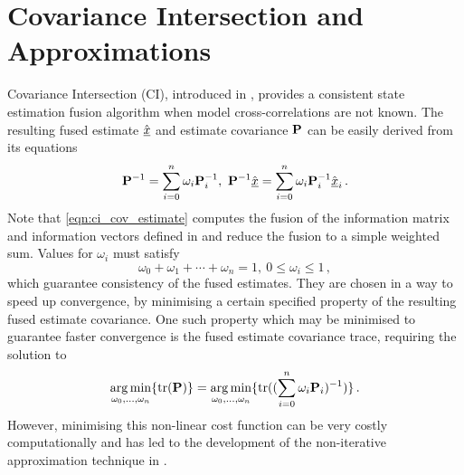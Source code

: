 \documentclass[letterpaper, 10 pt, conference]{ieeeconf}  %
\begin{document}
\section{Covariance Intersection and Approximations} \label{sec:ci}
Covariance Intersection (CI), introduced in \cite{julierNondivergentEstimationAlgorithm}, provides a consistent state estimation fusion algorithm when model cross-correlations are not known. The resulting fused estimate $\hat{{\underline{x}}}$ and estimate covariance ${{\mathbf{P}}}$ can be easily derived from its equations
\begin{equation}
   {\ensuremath{{\mathbf{P}}}}^{-1}=\sum_{i=0}^{n}\omega_i {{\mathbf{P}}}_i^{-1},\ {{\mathbf{P}}}^{-1} \hat{{\underline{x}}} =\sum_{i=0}^{n}\omega_i {{\mathbf{P}}}_i^{-1} \hat{{\underline{x}}}_i\,. \label{eqn:ci_cov_estimate}
\end{equation}
Note that \eqref{eqn:ci_cov_estimate} computes the fusion of the information matrix and information vectors defined in \cite{niehsenInformationFusionBased2002} and reduce the fusion to a simple weighted sum.
Values for $\omega_i$ must satisfy
\begin{equation}
   \omega_0 + \omega_1 + \cdots + \omega_n = 1,\ 0 \leq \omega_i \leq 1\,, \label{eqn:ci_omega_sum_bound}
\end{equation}
which guarantee consistency of the fused estimates. They are chosen in a way to speed up convergence, by minimising a certain specified property of the resulting fused estimate covariance. One such property which may be minimised to guarantee faster convergence is the fused estimate covariance trace, requiring the solution to
\begin{equation}
   \operatorname*{arg\,min}_{\omega_0,\dots,\omega_n} \{\operatorname{tr}({{\mathbf{P}}})\} = \operatorname*{arg\,min}_{\omega_0,\dots,\omega_n} \{\operatorname{tr}((\sum_{i=0}^{n}\omega_i {{\mathbf{P}}}_i)^{-1})\}\,. \label{eqn:ci_trace_min}
\end{equation}
However, minimising this non-linear cost function can be very costly computationally and has led to the development of the non-iterative approximation technique in \cite{niehsenInformationFusionBased2002}.
\end{document}
